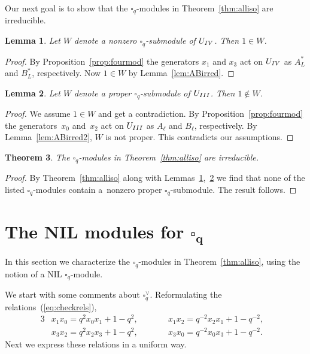 \documentclass[11pt]{article}
\numberwithin{equation}{section}
\numberwithin{equation}{section}
\newtheorem{Theorem}{Theorem}[section]
\newtheorem{Lemma}[Theorem]{Lemma}
\begin{document}
{Our next goal is to show that the $\square_q$-modules in Theorem~\ref{thm:alliso} are irreducible.

\begin{Lemma} \label{lem:irred1}Let $W$ denote a nonzero $\square_q$-submodule of $U_{\rm IV}$. Then $1 \in W$.
\end{Lemma}
\begin{proof}By Proposition~\ref{prop:fourmod} the generators $x_1$ and $x_3$ act on $U_{\rm IV}$ as $A^*_L$ and $B^*_L$, respectively. Now $1 \in W$ by Lemma~\ref{lem:ABirred}.
\end{proof}

\begin{Lemma}\label{lem:irred2}Let $W$ denote a proper $\square_q$-submodule of $U_{\rm III}$. Then $1 \not\in W$.
\end{Lemma}
\begin{proof}We assume $1 \in W$ and get a contradiction. By Proposition~\ref{prop:fourmod} the genera\-tors~$x_0$ and~$x_2$ act on $U_{\rm III}$ as $A_\ell$ and $B_\ell$, respectively. By Lemma~\ref{lem:ABirred2}, $W$ is not proper. This contradicts our assumptions.
\end{proof}

\begin{Theorem}\label{thm:allirred}The $\square_q$-modules in Theorem~{\rm \ref{thm:alliso}} are irreducible.
\end{Theorem}
\begin{proof} By Theorem~\ref{thm:alliso} along with Lemmas~\ref{lem:irred1},~\ref{lem:irred2} we find that
none of the listed $\square_q$-modules contain a~nonzero proper $\square_q$-submodule. The result follows.
\end{proof}

\section[The NIL modules for $\square_q$]{The NIL modules for $\boldsymbol{\square_q}$}\label{section15}

In this section we characterize the $\square_q$-modules in Theorem~\ref{thm:alliso}, using the notion of a NIL $\square_q$-module.

We start with some comments about $\square^\vee_q$. Reformulating the relations~(\ref{eq:checkrels}),
\begin{alignat*}{3}
&x_1 x_0 = q^2 x_0 x_1 + 1-q^2, \qquad && x_1 x_2 = q^{-2} x_ 2x_1 + 1-q^{-2},&\\
&x_3 x_2 = q^2 x_2 x_3 + 1-q^2, \qquad && x_3 x_0 = q^{-2} x_0 x_3 + 1-q^{-2}.&
\end{alignat*}
Next we express these relations in a uniform way.

}
\end{document}
